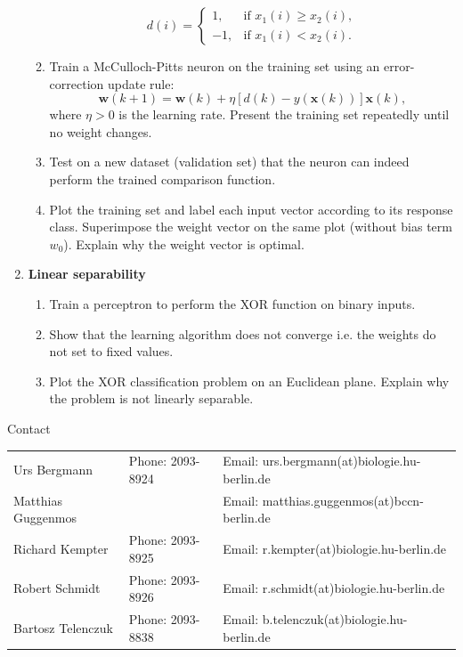 \documentclass[12pt, a4]{article}
\begin{document}
\begin{enumerate}
\begin{enumerate}
                \begin{equation*}
                    d(i)=
                    \begin{cases}
                        1, & \text{if } x_1(i)\geq x_2(i), \\
                        -1, & \text{if } x_1(i)<x_2(i).
                    \end{cases}
                \end{equation*}
            \item Train a McCulloch-Pitts neuron on the training set
                using an error-correction update rule:
                \begin{equation}
                    \textbf{w}(k+1)=\mathbf{w}(k)+\eta
                    [d(k)-y(\mathbf{x}(k))]\mathbf{x}(k),
                \end{equation}
                where $\eta>0$ is the learning rate.
                Present the training set repeatedly until no weight
                changes.
            \item Test on a new dataset (validation set) that the
                neuron can indeed perform the trained comparison function.
            \item Plot the training set and label each input vector according
                to its response class. Superimpose the weight vector on the
                same plot (without bias term $w_0$). Explain why the
                weight vector is optimal.

        \end{enumerate}
    \item \textbf{Linear separability}
        \begin{enumerate}
            \item Train a perceptron to perform the XOR function on binary
                inputs.
            \item Show that the learning algorithm does not converge
                i.e. the weights do not set to fixed values.
            \item Plot the XOR classification problem on an
                Euclidean plane. Explain why the problem is not
                linearly separable. 
        \end{enumerate}

\end{enumerate}

\vfill
\centerline{\CAP Contact}
\CAP

\begin{tabular}{lll}
Urs Bergmann & Phone: 2093-8924 & Email:
urs.bergmann(at)biologie.hu-berlin.de \\
Matthias Guggenmos & & Email: matthias.guggenmos(at)bccn-berlin.de \\
Richard Kempter \hfill & Phone: 2093-8925 \hfill & Email:
r.kempter(at)biologie.hu-berlin.de \\
Robert Schmidt & Phone: 2093-8926 & Email: r.schmidt(at)biologie.hu-berlin.de
\\
Bartosz Telenczuk & Phone: 2093-8838 & Email:
b.telenczuk(at)biologie.hu-berlin.de \\
\end{tabular}
\end{document}
